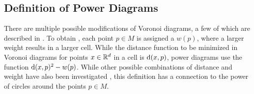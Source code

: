 \subsection{Definition of Power Diagrams}
\label{sub:definition_of_power_diagrams}
There are multiple possible modifications of Voronoi diagrams, a few of which are described in \cite{aurenhammer1987power}.
To obtain , each point $p \in M$ is assigned a  $w(p)$, where a larger weight results in a larger cell.
While the distance function to be minimized in Voronoi diagrams for points $x \in \mathbb{R}^d$ in a cell is $\operatorname{d}(x, p)$, power diagrams use the function $\operatorname{d}(x, p)^2 - w(p)$.
While other possible combinations of distance and weight have also been investigated \cite{aurenhammer1987power}, this definition has a connection to the power of circles around the points $p \in M$.

